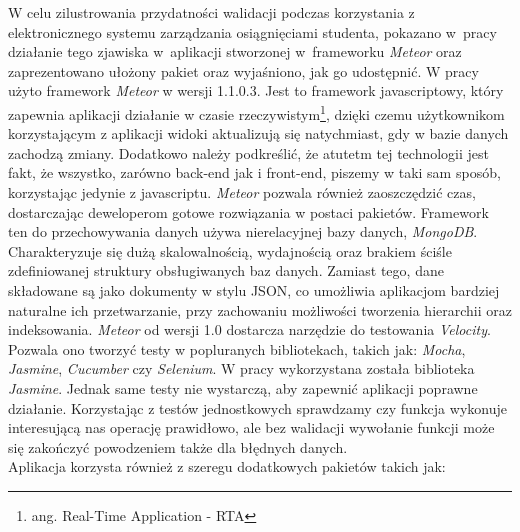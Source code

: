 \documentclass[openright]{xmgr}
\begin{document}
\indent W celu zilustrowania przydatności walidacji podczas korzystania
z elektronicznego systemu zarządzania osiągnięciami studenta, pokazano w~pracy
działanie tego zjawiska w~aplikacji stworzonej w~frameworku \textit{Meteor} oraz 
zaprezentowano ułożony pakiet oraz wyjaśniono, jak go udostępnić. W pracy użyto framework \textit{Meteor} w wersji 1.1.0.3. Jest to framework javascriptowy, który zapewnia aplikacji działanie w czasie rzeczywistym\footnote{ang. Real-Time Application - RTA}, dzięki czemu użytkownikom korzystającym z aplikacji widoki aktualizują się natychmiast, gdy w bazie danych zachodzą zmiany. Dodatkowo należy podkreślić, że atutetm tej technologii jest fakt, że wszystko, zarówno back-end jak i front-end, piszemy w taki sam sposób, korzystając jedynie z javascriptu. \textit{Meteor} pozwala również zaoszczędzić czas, dostarczając deweloperom gotowe rozwiązania w postaci pakietów. Framework ten do przechowywania danych używa nierelacyjnej bazy danych, \textit{MongoDB}\cite{MongoDocs}. Charakteryzuje się dużą skalowalnością, wydajnością oraz brakiem ściśle zdefiniowanej struktury obsługiwanych baz danych. Zamiast tego, dane składowane są jako dokumenty w stylu JSON, co umożliwia aplikacjom bardziej naturalne ich przetwarzanie, przy zachowaniu możliwości tworzenia hierarchii oraz indeksowania. \textit{Meteor} od wersji 1.0 dostarcza narzędzie do testowania \textit{Velocity}. Pozwala ono tworzyć testy w popluranych bibliotekach, takich jak: \textit{Mocha}, \textit{Jasmine}, \textit{Cucumber} czy \textit{Selenium}. W pracy wykorzystana została biblioteka \textit{Jasmine}. Jednak same testy nie wystarczą, aby zapewnić aplikacji poprawne działanie. Korzystając z testów jednostkowych sprawdzamy czy funkcja wykonuje interesującą nas operację prawidłowo, ale bez walidacji wywołanie funkcji może się zakończyć powodzeniem także dla błędnych danych. 
\\
\indent Aplikacja korzysta również z szeregu dodatkowych pakietów takich jak:
\end{document}
